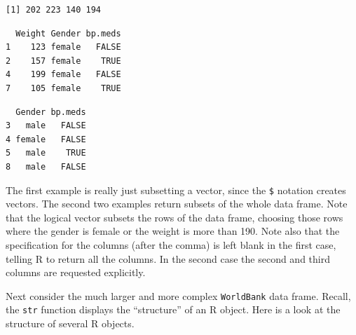 \documentclass[]{krantz}
\makeatletter
\newenvironment{Shaded}{\begin{snugshade}}{\end{snugshade}}
\newcommand{\DecValTok}[1]{\textcolor[rgb]{0.06,0.06,0.06}{#1}}
\newcommand{\NormalTok}[1]{#1}
\newcommand{\OperatorTok}[1]{\textcolor[rgb]{0.43,0.43,0.43}{\textbf{#1}}}
\newcommand{\StringTok}[1]{\textcolor[rgb]{0.5,0.5,0.5}{#1}}
\newenvironment{kframe}{%
\medskip{}
\setlength{\fboxsep}{.8em}
 \def\at@end@of@kframe{}%
 \ifinner\ifhmode%
  \def\at@end@of@kframe{\end{minipage}}%
  \begin{minipage}{\columnwidth}%
 \fi\fi%
 \def\FrameCommand##1{\hskip\@totalleftmargin \hskip-\fboxsep
 \colorbox{shadecolor}{##1}\hskip-\fboxsep
     \hskip-\linewidth \hskip-\@totalleftmargin \hskip\columnwidth}%
 \MakeFramed {\advance\hsize-\width
   \@totalleftmargin\z@ \linewidth\hsize
   \@setminipage}}%
 {\par\unskip\endMakeFramed%
 \at@end@of@kframe}
\renewenvironment{Shaded}{\begin{kframe}}{\end{kframe}}
\makeatother
\begin{document}
\begin{Shaded}
\end{Shaded}

\begin{verbatim}
[1] 202 223 140 194
\end{verbatim}

\begin{Shaded}
\end{Shaded}

\begin{verbatim}
  Weight Gender bp.meds
1    123 female   FALSE
2    157 female    TRUE
4    199 female   FALSE
7    105 female    TRUE
\end{verbatim}

\begin{Shaded}
\end{Shaded}

\begin{verbatim}
  Gender bp.meds
3   male   FALSE
4 female   FALSE
5   male    TRUE
8   male   FALSE
\end{verbatim}

The first example is really just subsetting a vector, since the \texttt{\$} notation creates vectors. The second two examples return subsets of the whole data frame. Note that the logical vector subsets the rows of the data frame, choosing those rows where the gender is female or the weight is more than 190. Note also that the specification for the columns (after the comma) is left blank in the first case, telling R to return all the columns. In the second case the second and third columns are requested explicitly.

Next consider the much larger and more complex \texttt{WorldBank} data frame. Recall, the \texttt{str} function displays the ``structure'' of an R object. Here is a look at the structure of several R objects.
\end{document}
